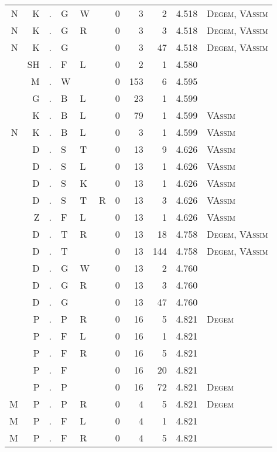 \begin{longtable}{r@{ } r@{ } c@{ } l@{ } l@{ } l@{ } r r r r l }
N & K & . & G & W &   & 0 & 3 & 2 & 4.518 & \textsc{Degem}, \textsc{VAssim} \\
N & K & . & G & R &   & 0 & 3 & 3 & 4.518 & \textsc{Degem}, \textsc{VAssim} \\
N & K & . & G &   &   & 0 & 3 & 47 & 4.518 & \textsc{Degem}, \textsc{VAssim} \\
  & SH & . & F & L &   & 0 & 2 & 1 & 4.580 &  \\
  & M & . & W &   &   & 0 & 153 & 6 & 4.595 &  \\
  & G & . & B & L &   & 0 & 23 & 1 & 4.599 &  \\
  & K & . & B & L &   & 0 & 79 & 1 & 4.599 & \textsc{VAssim} \\
N & K & . & B & L &   & 0 & 3 & 1 & 4.599 & \textsc{VAssim} \\
  & D & . & S & T &   & 0 & 13 & 9 & 4.626 & \textsc{VAssim} \\
  & D & . & S & L &   & 0 & 13 & 1 & 4.626 & \textsc{VAssim} \\
  & D & . & S & K &   & 0 & 13 & 1 & 4.626 & \textsc{VAssim} \\
  & D & . & S & T & R & 0 & 13 & 3 & 4.626 & \textsc{VAssim} \\
  & Z & . & F & L &   & 0 & 13 & 1 & 4.626 & \textsc{VAssim} \\
  & D & . & T & R &   & 0 & 13 & 18 & 4.758 & \textsc{Degem}, \textsc{VAssim} \\
  & D & . & T &   &   & 0 & 13 & 144 & 4.758 & \textsc{Degem}, \textsc{VAssim} \\
  & D & . & G & W &   & 0 & 13 & 2 & 4.760 &  \\
  & D & . & G & R &   & 0 & 13 & 3 & 4.760 &  \\
  & D & . & G &   &   & 0 & 13 & 47 & 4.760 &  \\
  & P & . & P & R &   & 0 & 16 & 5 & 4.821 & \textsc{Degem} \\
  & P & . & F & L &   & 0 & 16 & 1 & 4.821 &  \\
  & P & . & F & R &   & 0 & 16 & 5 & 4.821 &  \\
  & P & . & F &   &   & 0 & 16 & 20 & 4.821 &  \\
  & P & . & P &   &   & 0 & 16 & 72 & 4.821 & \textsc{Degem} \\
M & P & . & P & R &   & 0 & 4 & 5 & 4.821 & \textsc{Degem} \\
M & P & . & F & L &   & 0 & 4 & 1 & 4.821 &  \\
M & P & . & F & R &   & 0 & 4 & 5 & 4.821 &  \\

\end{longtable}
